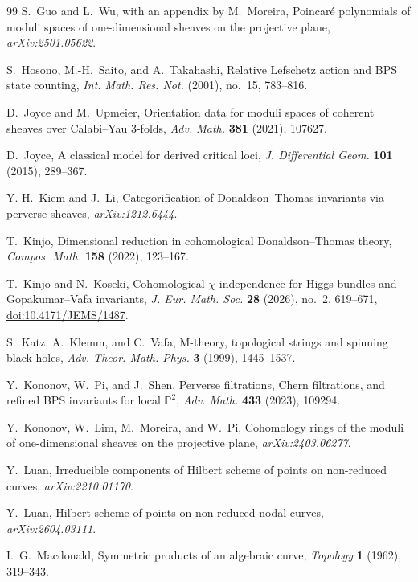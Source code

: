 \documentclass[11pt,reqno]{amsart}
\theoremstyle{definition}
\newcommand{\Pp}{\mathbb P}
\begin{document}
\begin{thebibliography}{99}
S.~Guo and L.~Wu, with an appendix by M.~Moreira,
Poincar\'e polynomials of moduli spaces of one-dimensional sheaves on the
projective plane,
\emph{arXiv:2501.05622}.

S.~Hosono, M.-H.~Saito, and A.~Takahashi,
Relative Lefschetz action and BPS state counting,
\emph{Int. Math. Res. Not.} (2001), no.~15, 783--816.

D.~Joyce and M.~Upmeier,
Orientation data for moduli spaces of coherent sheaves over Calabi--Yau
3-folds,
\emph{Adv. Math.} \textbf{381} (2021), 107627.

D.~Joyce,
A classical model for derived critical loci,
\emph{J. Differential Geom.} \textbf{101} (2015), 289--367.

Y.-H.~Kiem and J.~Li,
Categorification of Donaldson--Thomas invariants via perverse sheaves,
\emph{arXiv:1212.6444}.

T.~Kinjo,
Dimensional reduction in cohomological Donaldson--Thomas theory,
\emph{Compos. Math.} \textbf{158} (2022), 123--167.

T.~Kinjo and N.~Koseki,
Cohomological $\chi$-independence for Higgs bundles and
Gopakumar--Vafa invariants,
\emph{J. Eur. Math. Soc.} \textbf{28} (2026), no.~2, 619--671,
\href{https://doi.org/10.4171/JEMS/1487}{doi:10.4171/JEMS/1487}.

S.~Katz, A.~Klemm, and C.~Vafa,
M-theory, topological strings and spinning black holes,
\emph{Adv. Theor. Math. Phys.} \textbf{3} (1999), 1445--1537.

Y.~Kononov, W.~Pi, and J.~Shen,
Perverse filtrations, Chern filtrations, and refined BPS invariants for
local $\Pp^2$,
\emph{Adv. Math.} \textbf{433} (2023), 109294.

Y.~Kononov, W.~Lim, M.~Moreira, and W.~Pi,
Cohomology rings of the moduli of one-dimensional sheaves on the projective
plane,
\emph{arXiv:2403.06277}.

Y.~Luan,
Irreducible components of Hilbert scheme of points on non-reduced curves,
\emph{arXiv:2210.01170}.

Y.~Luan,
Hilbert scheme of points on non-reduced nodal curves,
\emph{arXiv:2604.03111}.

I.~G.~Macdonald,
Symmetric products of an algebraic curve,
\emph{Topology} \textbf{1} (1962), 319--343.


\end{thebibliography}
\end{document}
